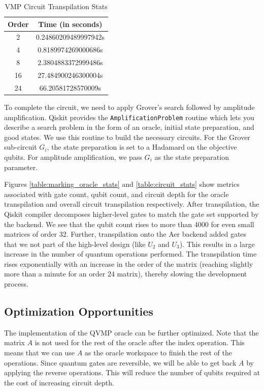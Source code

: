 \documentclass[10pt]{proc}
\theoremstyle{definition}
\theoremstyle{remark}
\begin{document}
\begin{table}[!ht]
  \centering
  \begin{tabular}{|c|c|}
   \hline
    Order & Time (in seconds) \\
   \hline
    2 & 0.24860209489997942s \\
    4 & 0.8189974269000686s \\
    8 & 2.3804883372999486s \\ 
    16 & 27.484900246300004s \\
    24 & 66.20581728570009s \\
    \hline
  \end{tabular}
  \caption{VMP Circuit Transpilation Stats}
  \label{table:transpilation_stats}

\end{table}

To complete the circuit, we need to apply Grover's search followed by amplitude
amplification. Qiskit provides the \verb|AmplificationProblem| routine which lets
you describe a search problem in the form of an oracle, initial state
preparation, and good states. We use this routine to build the necessary
circuits. For the Grover sub-circuit $G_i$, the state preparation is set to a
Hadamard on the objective qubits. For amplitude amplification, we pass $G_i$ as
the state preparation parameter.

Figures \ref{table:marking_oracle_stats} and \ref{table:circuit_stats} show metrics
associated with gate count, qubit count, and circuit depth for the oracle
transpilation and overall circuit transpilation respectively. After
transpilation, the Qiskit compiler decomposes higher-level gates to match the
gate set supported by the backend. We see that the qubit count rises to more
than 4000 for even small matrices of order 32. Further, transpilation onto the
Aer backend added gates that we not part of the high-level design (like $U_2$
and $U_3$). This results in a large increase in the number of quantum
operations performed. The transpilation time rises exponentially with an
increase in the order of the matrix (reaching slightly more than a minute for
an order 24 matrix), thereby slowing the development process.

\vfill

\subsection{Optimization Opportunities}

The implementation of the QVMP oracle can be further optimized. Note that the
matrix $A$ is not used for the rest of the oracle after the index operation.
This means that we can use $A$ as the oracle workspace to finish the rest of
the operations. Since quantum gates are reversible, we will be able to get back
$A$ by applying the reverse operations. This will reduce the number of qubits
required at the cost of increasing circuit depth.
\end{document}
